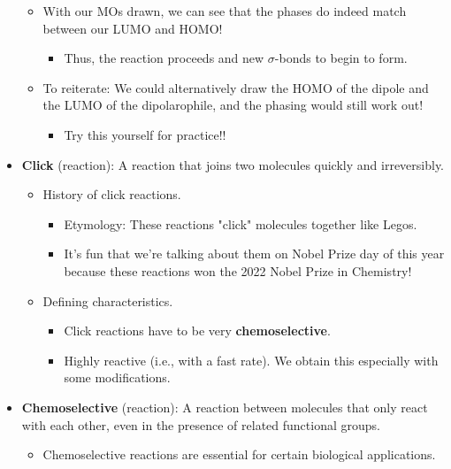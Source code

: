 \documentclass[../notes.tex]{subfiles}
\begin{document}
\begin{itemize}
\begin{itemize}
\begin{itemize}
        \end{itemize}
        \item With our MOs drawn, we can see that the phases do indeed match between our LUMO and HOMO!
        \begin{itemize}
            \item Thus, the reaction proceeds and new $\sigma$-bonds to begin to form.
        \end{itemize}
        \item To reiterate: We could alternatively draw the HOMO of the dipole and the LUMO of the dipolarophile, and the phasing would still work out!
        \begin{itemize}
            \item Try this yourself for practice!!
        \end{itemize}
    \end{itemize}
    \item \textbf{Click} (reaction): A reaction that joins two molecules quickly and irreversibly.
    \begin{itemize}
        \item History of click reactions.
        \begin{itemize}
            \item Etymology: These reactions "click" molecules together like Legos.
            \item It's fun that we're talking about them on Nobel Prize day of this year because these reactions won the 2022 Nobel Prize in Chemistry!
        \end{itemize}
        \item Defining characteristics.
        \begin{itemize}
            \item Click reactions have to be very \textbf{chemoselective}.
            \item Highly reactive (i.e., with a fast rate). We obtain this especially with some modifications.
        \end{itemize}
    \end{itemize}
    \item \textbf{Chemoselective} (reaction): A reaction between molecules that only react with each other, even in the presence of related functional groups.
    \begin{itemize}
        \item Chemoselective reactions are essential for certain biological applications.
        \begin{itemize}

\end{itemize}
\end{itemize}
\end{itemize}
\end{document}
